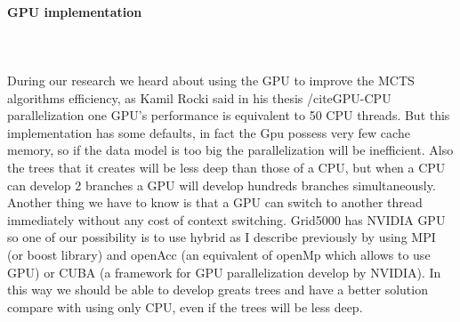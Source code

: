 \paragraph{GPU implementation}\mbox{}\\\mbox{}\\
	During our research we heard about using the GPU to improve the MCTS algorithms efficiency, as Kamil Rocki said in his thesis /cite{GPU-CPU parallelization} one GPU's performance is equivalent to 50 CPU threads. But this implementation has some defaults, in fact the Gpu possess very few cache memory, so if the data model is too big the parallelization will be inefficient. Also the trees that it creates will be less deep than those of a CPU, but when a CPU can develop 2 branches a GPU will develop hundreds branches simultaneously. Another thing we have to know is that a GPU can switch to another thread immediately without any cost of context switching. 
	Grid5000 has NVIDIA GPU so one of our possibility is to use hybrid as I describe previously by using MPI (or boost library) and openAcc (an equivalent of openMp which allows to use GPU) or CUBA (a framework for GPU parallelization develop by NVIDIA). In this way we should be able to develop greats trees and have a better solution compare with using only CPU, even if the trees will be less deep.
